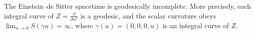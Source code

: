The Einstein–de Sitter spacetime is geodesically incomplete. More precisely, each integral curve of $Z = \frac{\partial}{\partial u^4}$ is a geodesic, and the scalar curvature obeys $\lim_{u \to 0} S(\gamma u) = \infty$, where $\gamma(u) = (0, 0, 0, u)$ is an integral curve of $Z$.
